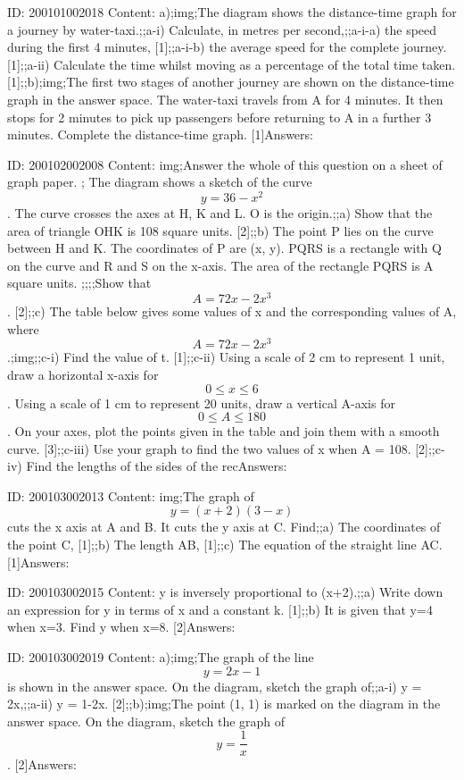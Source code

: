 \documentclass{article}
\begin{document}
ID: 200101002018
Content:
a);img;The diagram shows the distance-time graph for a journey by water-taxi.;;a-i) Calculate, in metres per second,;;a-i-a) the speed during the first 4 minutes, [1];;a-i-b) the average speed for the complete journey. [1];;a-ii) Calculate the time whilst moving as a percentage of the total time taken. [1];;b);img;The first two stages of another journey are shown on the distance-time graph in the answer space. The water-taxi travels from A for 4 minutes. It then stops for 2 minutes to pick up passengers before returning to A in a further 3 minutes. Complete the distance-time graph. [1]Answers:

ID: 200102002008
Content:
img;Answer the whole of this question on a sheet of graph paper. ; The diagram shows a sketch of the curve $$y=36-x^{2} $$. The curve crosses the axes at H, K and L. O is the origin.;;a) Show that the area of triangle OHK is 108 square units. [2];;b) The point P lies on the curve between H and K. The coordinates of P are (x, y). PQRS is a rectangle with Q on the curve and R and S on the x-axis. The area of the rectangle PQRS is A square units. ;;;;Show that $$A=72x-2x^{3} $$. [2];;c) The table below gives some values of x and the corresponding values of A, where $$A=72x-2x^{3} $$.;img;;c-i) Find the value of t. [1];;c-ii) Using a scale of 2 cm to represent 1 unit, draw a horizontal x-axis for $$0\leq x\leq 6$$. Using a scale of 1 cm to represent 20 units, draw a vertical A-axis for $$0\leq A\leq 180$$. On your axes, plot the points given in the table and join them with a smooth curve. [3];;c-iii) Use your graph to find the two values of x when A = 108. [2];;c-iv) Find the lengths of the sides of the recAnswers:

ID: 200103002013
Content:
img;The graph of $$y = (x + 2)(3 - x)$$ cuts the x axis at A and B. It cuts the y axis at C. Find;;a) The coordinates of the point C,    [1];;b) The length AB,    [1];;c) The equation of the straight line AC.    [1]Answers:

ID: 200103002015
Content:
y is inversely proportional to (x+2).;;a) Write down an expression for y in terms of x and a constant k.    [1];;b) It is given that y=4 when x=3. Find y when x=8.    [2]Answers:

ID: 200103002019
Content:
a);img;The graph of the line $$y = 2x - 1$$ is shown in the answer space. On the diagram, sketch the graph of;;a-i) y = 2x,;;a-ii) y = 1-2x. [2];;b);img;The point (1, 1) is marked on the diagram in the answer space. On the diagram, sketch the graph of $$y = \frac{1}{x}$$.    [2]Answers:
\end{document}
